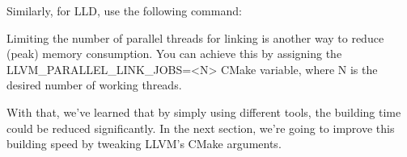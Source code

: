 Similarly, for LLD, use the following command:


\begin{tcolorbox}[colback=white!5!white,colframe=black!75!white, title=Limiting the number of parallel threads for Linking]
\hspace*{0.7cm}Limiting the number of parallel threads for linking is another way to reduce (peak) memory consumption. You can achieve this by assigning the LLVM\_PARALLEL\_LINK\_JOBS=<N> CMake variable, where N is the desired number of working threads.
\end{tcolorbox}

With that, we've learned that by simply using different tools, the building time could be reduced significantly. In the next section, we're going to improve this building speed by tweaking LLVM's CMake arguments.




